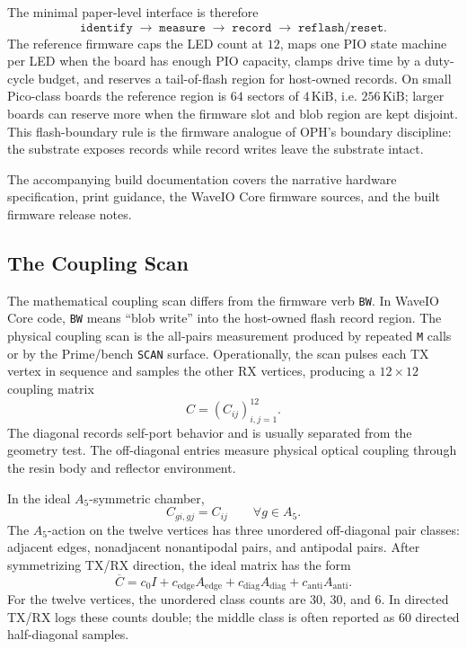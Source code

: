 \documentclass[11pt]{article}
\theoremstyle{remark}
\theoremstyle{plain}
\newcommand{\diag}{\mathrm{diag}}
\newcommand{\anti}{\mathrm{anti}}
\begin{document}
The minimal paper-level interface is therefore
\[
\boxed{
\texttt{identify}
\;\to\;
\texttt{measure}
\;\to\;
\texttt{record}
\;\to\;
\texttt{reflash/reset}.
}
\]
The reference firmware caps the LED count at \(12\), maps one PIO state machine per LED when the board has enough PIO capacity, clamps drive time by a duty-cycle budget, and reserves a tail-of-flash region for host-owned records. On small Pico-class boards the reference region is \(64\) sectors of \(4\,\mathrm{KiB}\), i.e. \(256\,\mathrm{KiB}\); larger boards can reserve more when the firmware slot and blob region are kept disjoint. This flash-boundary rule is the firmware analogue of OPH's boundary discipline: the substrate exposes records while record writes leave the substrate intact.

The accompanying build documentation covers the narrative hardware
specification, print guidance, the WaveIO Core firmware sources, and the built
firmware release notes.

\subsection{The Coupling Scan}

The mathematical coupling scan differs from the firmware verb \texttt{BW}. In WaveIO Core code, \texttt{BW} means ``blob write'' into the host-owned flash record region. The physical coupling scan is the all-pairs measurement produced by repeated \texttt{M} calls or by the Prime/bench \texttt{SCAN} surface. Operationally, the scan pulses each TX vertex in sequence and samples the other RX vertices, producing a \(12\times12\) coupling matrix
\[
C=(C_{ij})_{i,j=1}^{12}.
\]
The diagonal records self-port behavior and is usually separated from the geometry test. The off-diagonal entries measure physical optical coupling through the resin body and reflector environment.

In the ideal \(A_5\)-symmetric chamber,
\[
C_{g i,g j}=C_{ij}
\qquad
\forall g\in A_5.
\]
The \(A_5\)-action on the twelve vertices has three unordered off-diagonal pair classes: adjacent edges, nonadjacent nonantipodal pairs, and antipodal pairs. After symmetrizing TX/RX direction, the ideal matrix has the form
\[
\overline C
=
c_0 I+c_{\mathrm{edge}}A_{\mathrm{edge}}
+c_{\diag}A_{\diag}
+c_{\anti}A_{\anti}.
\]
For the twelve vertices, the unordered class counts are \(30\), \(30\), and \(6\). In directed TX/RX logs these counts double; the middle class is often reported as \(60\) directed half-diagonal samples.
\end{document}
